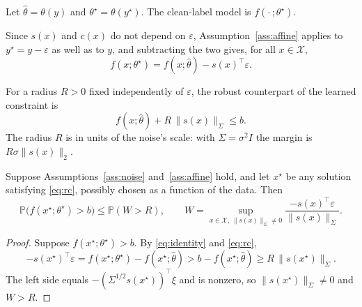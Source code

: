 \begin{definition}\label{def:clean}
Let $\hat\theta = \theta(y)$ and $\theta^\star = \theta(y^\star)$. The
clean-label model is $f(\cdot\,;\theta^\star)$.
\end{definition}

Since $s(x)$ and $c(x)$ do not depend on $\varepsilon$,
Assumption~\ref{ass:affine} applies to $y^\star = y - \varepsilon$ as well as to
$y$, and subtracting the two gives, for all $x \in \mathcal{X}$,
\begin{equation}\label{eq:identity}
  f(x;\theta^\star) = f(x;\hat\theta) - s(x)^\top \varepsilon .
\end{equation}

For a radius $R > 0$ fixed independently of $\varepsilon$, the robust
counterpart of the learned constraint is
\begin{equation}\label{eq:rc}
  f(x;\hat\theta) + R\,\|s(x)\|_\Sigma \le b .
\end{equation}
The radius $R$ is in units of the noise's scale: with $\Sigma = \sigma^2 I$ the
margin is $R\sigma\|s(x)\|_2$.

\begin{theorem}\label{thm:selection}
Suppose Assumptions~\ref{ass:noise} and~\ref{ass:affine} hold, and let $x^\star$
be any solution satisfying \eqref{eq:rc}, possibly chosen as a function of the
data. Then
\[
  \mathbb{P}\bigl(f(x^\star;\theta^\star) > b\bigr) \le \mathbb{P}(W > R),
  \qquad
  W = \sup_{x \in \mathcal{X},\, \|s(x)\|_\Sigma \neq 0}
      \frac{-s(x)^\top \varepsilon}{\|s(x)\|_\Sigma} .
\]
\end{theorem}

\begin{proof}
Suppose $f(x^\star;\theta^\star) > b$. By \eqref{eq:identity} and
\eqref{eq:rc},
\[
  -s(x^\star)^\top \varepsilon
  = f(x^\star;\theta^\star) - f(x^\star;\hat\theta)
  > b - f(x^\star;\hat\theta)
  \ge R\,\|s(x^\star)\|_\Sigma .
\]
The left side equals $-(\Sigma^{1/2}s(x^\star))^\top\xi$ and is nonzero, so
$\|s(x^\star)\|_\Sigma \neq 0$ and $W > R$.
\end{proof}

